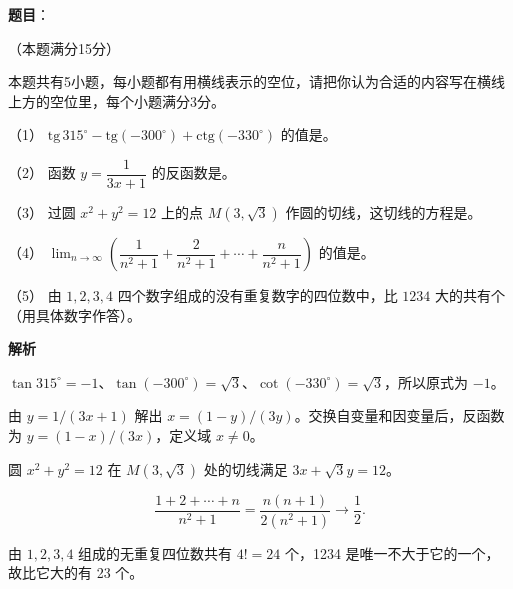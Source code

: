 \begin{answer}

\textbf{题目}：

（本题满分15分）

本题共有5小题，每小题都有用横线表示的空位，请把你认为合适的内容写在横线上方的空位里，每个小题满分3分。

（1） $\mathrm{tg}\,315^\circ-\mathrm{tg}(-300^\circ)+\mathrm{ctg}(-330^\circ)$ 的值是\gkblank{}。

（2） 函数 $y=\dfrac1{3x+1}$ 的反函数是\gkblank{}。

（3） 过圆 $x^2+y^2=12$ 上的点 $M(3,\sqrt3)$ 作圆的切线，这切线的方程是\gkblank{}。

（4） $\displaystyle\lim_{n\to\infty}\left(\dfrac1{n^2+1}+\dfrac2{n^2+1}+\cdots+\dfrac n{n^2+1}\right)$ 的值是\gkblank{}。

（5） 由 $1,2,3,4$ 四个数字组成的没有重复数字的四位数中，比 $1234$ 大的共有\gkblank{}个（用具体数字作答）。

\textbf{解析}


$\tan315^\circ=-1$、$\tan(-300^\circ)=\sqrt3$、$\cot(-330^\circ)=\sqrt3$，所以原式为 $-1$。


由 $y=1/(3x+1)$ 解出 $x=(1-y)/(3y)$。交换自变量和因变量后，反函数为 $y=(1-x)/(3x)$，定义域 $x\ne0$。


圆 $x^2+y^2=12$ 在 $M(3,\sqrt3)$ 处的切线满足 $3x+\sqrt3y=12$。


\nopagebreak[4]
\[
\frac{1+2+\cdots+n}{n^2+1}
=\frac{n(n+1)}{2(n^2+1)}
\longrightarrow\frac12.
\]


由 $1,2,3,4$ 组成的无重复四位数共有 $4!=24$ 个，1234 是唯一不大于它的一个，故比它大的有 23 个。






\end{answer}
